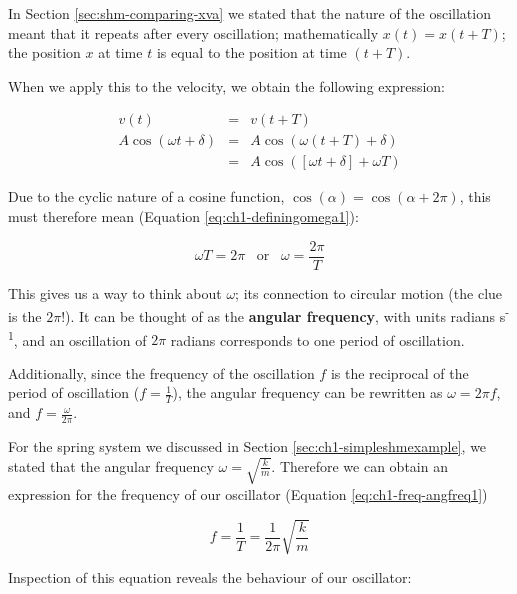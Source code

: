 \documentclass[
]{book}
\begin{document}
In Section \ref{sec:shm-comparing-xva} we stated that the nature of the oscillation meant that it repeats after every oscillation; mathematically \(x(t) = x(t + T)\); the position \(x\) at time \(t\) is equal to the position at time \((t+T)\).

When we apply this to the velocity, we obtain the following expression:

\begin{equation}
\begin{array}{rcl}
v(t) &=& v(t+T) \\
A \cos (\omega t + \delta) &=& A \cos (\omega (t+T) + \delta) \\
&=& A \cos ([\omega t + \delta] + \omega T)
\end{array}
\end{equation}

Due to the cyclic nature of a cosine function, \(\cos (\alpha) = \cos (\alpha + 2\pi)\), this must therefore mean (Equation \eqref{eq:ch1-definingomega1}):

\begin{equation}
\omega T = 2\pi \hspace{10pt} \textrm{or} \hspace{10pt} \omega = \frac{2\pi}{T}
\label{eq:ch1-definingomega1}
\end{equation}

This gives us a way to think about \(\omega\); its connection to circular motion (the clue is the \(2\pi\)!). It can be thought of as the \textbf{angular frequency}, with units radians s\textsuperscript{-1}, and an oscillation of \(2\pi\) radians corresponds to one period of oscillation.

Additionally, since the frequency of the oscillation \(f\) is the reciprocal of the period of oscillation (\(f = \frac{1}{T}\)), the angular frequency can be rewritten as \(\omega = 2\pi f\), and \(f = \frac{\omega}{2\pi}\).

For the spring system we discussed in Section \ref{sec:ch1-simpleshmexample}, we stated that the angular frequency \(\omega = \sqrt{\frac{k}{m}}\). Therefore we can obtain an expression for the frequency of our oscillator (Equation \eqref{eq:ch1-freq-angfreq1})

\begin{equation}
f = \frac{1}{T} = \frac{1}{2\pi}\sqrt{\frac{k}{m}}
\label{eq:ch1-freq-angfreq1}
\end{equation}

Inspection of this equation reveals the behaviour of our oscillator:
\end{document}
